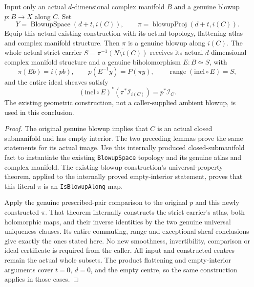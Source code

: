 \begin{theorem}
\label{hir:actual-zero-section-constructed-blowup-comparison}
\leanok
Input only an actual $d$-dimensional complex manifold $B$ and a genuine
blowup $p:B\to X$ along $C$. Set
\[
 Y=\operatorname{BlowupSpace}(d+t,i(C)),\qquad
 \pi=\operatorname{blowupProj}(d+t,i(C)).
\]
Equip this actual existing construction with its actual topology,
flattening atlas and complex manifold structure. Then $\pi$ is a
genuine blowup along $i(C)$. The whole actual strict carrier
$S=\overline{\pi^{-1}(N\setminus i(C))}$ receives its actual
$d$-dimensional complex manifold structure and a genuine biholomorphism
$E:B\simeq S$, with
\[
 \pi(Eb)=i(pb),\qquad p(E^{-1}y)=P(\pi y),\qquad
 \operatorname{range}(\mathrm{incl}\circ E)=S,
\]
and the entire ideal sheaves satisfy
\[
 (\mathrm{incl}\circ E)^*(\pi^*\mathcal I_{i(C)})=p^*\mathcal I_C.
\]
The existing geometric construction, not a caller-supplied ambient
blowup, is used in this conclusion.
\end{theorem}
\begin{proof}
The original genuine blowup implies that $C$ is an actual closed
submanifold and has empty interior. The two preceding lemmas prove the
same statements for its actual image. Use this internally produced
closed-submanifold fact to instantiate the existing
\texttt{BlowupSpace} topology and its genuine atlas and complex manifold.
The existing blowup construction's universal-property theorem, applied
to the internally proved empty-interior statement, proves that this
literal $\pi$ is an \texttt{IsBlowupAlong} map.

Apply the genuine prescribed-pair comparison to the original $p$ and
this newly constructed $\pi$. That theorem internally constructs the
strict carrier's atlas, both holomorphic maps, and their inverse
identities by the two genuine universal uniqueness clauses. Its entire
commuting, range and exceptional-sheaf conclusions give exactly the
ones stated here. No new smoothness, invertibility, comparison or ideal
certificate is required from the caller. All input and constructed
centres remain the actual whole subsets. The product flattening and
empty-interior arguments cover $t=0$, $d=0$, and the empty centre, so
the same construction applies in those cases.
\end{proof}
